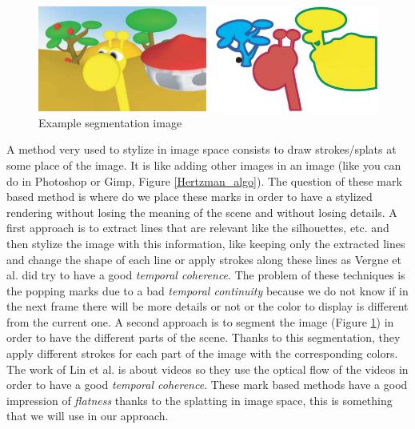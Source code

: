 \begin{figure}[H]
    \begin{center}

    \includegraphics[scale=0.5]{pics/segmentation_example.png}
    \end{center}
    \caption{Example segmentation image\cite{benard_state---art_2011}}
    \label{segmenation_example}
\end{figure}

A method very used to stylize in image space consists to draw strokes/splats at some place of the image\cite{bleron_motion-coherent_2018, vergne_implicit_2011, benard_active_nodate, zeng_image_2009, grabli_programmable_2010}. It is like adding other images in an image (like you can do in Photoshop or Gimp, Figure \ref{Hertzman_algo}). The question of these mark based method is where do we place these marks in order to have a stylized rendering without losing the meaning of the scene and without losing details. A first approach is to extract lines that are relevant like the silhouettes, etc. \cite{vergne_implicit_2011, grabli_programmable_2010, lee_line_nodate} and then stylize the image with this information, like keeping only the extracted lines and change the shape of each line or apply strokes along these lines as Vergne et al.\cite{vergne_implicit_2011} did try to have a good \textit{temporal coherence}. The problem of these techniques is the popping marks due to a bad \textit{temporal continuity} because we do not know if in the next frame there will be more details or not or the color to display is different from the current one.
A second approach is to segment the image (Figure \ref{segmenation_example}) in order to have the different parts of the scene\cite{zeng_image_2009, lin_video_nodate}. Thanks to this segmentation, they apply different strokes for each part of the image with the corresponding colors. The work of Lin et al.\cite{lin_video_nodate} is about videos so they use the optical flow of the videos in order to have a good \textit{temporal coherence}. These mark based methods have a good impression of \textit{flatness} thanks to the splatting in image space, this is something that we will use in our approach.

